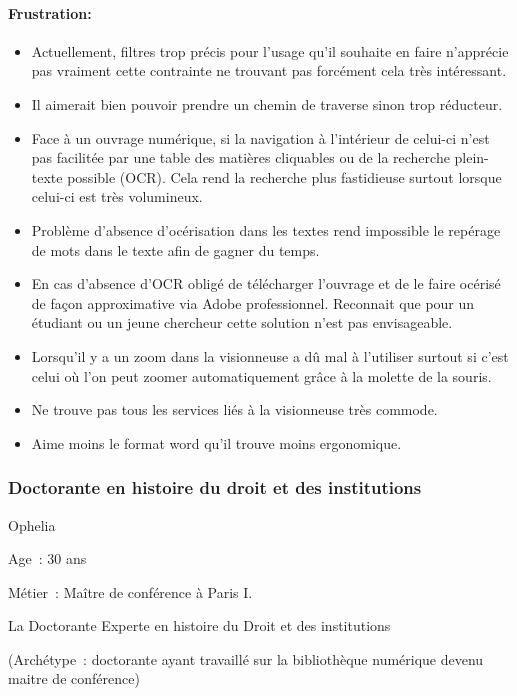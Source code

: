 \paragraph*{Frustration:} 

\begin{itemize}
	\item Actuellement, filtres trop précis pour l’usage qu’il souhaite en faire n’apprécie pas vraiment cette contrainte ne trouvant pas forcément cela très intéressant.
\item Il aimerait bien pouvoir prendre un chemin de traverse sinon trop réducteur.
\item Face à un ouvrage numérique, si la navigation à l’intérieur de celui-ci n’est pas facilitée par une table des matières cliquables ou de la recherche plein-texte possible (OCR). Cela rend la recherche plus fastidieuse surtout lorsque celui-ci est très volumineux.
\item Problème d’absence d’océrisation dans les textes rend impossible le repérage de mots dans le texte afin de gagner du temps. 
\item En cas d’absence d’OCR obligé de télécharger l’ouvrage et de le faire océrisé de façon approximative via Adobe professionnel. Reconnait que pour un étudiant ou un jeune chercheur cette solution n’est pas envisageable.
\item Lorsqu’il y a un zoom dans la visionneuse a dû mal à l’utiliser surtout si c’est celui où l’on peut zoomer automatiquement grâce à la molette de la souris.
\item Ne trouve pas tous les services liés à la visionneuse très commode.
\item Aime moins le format word qu’il trouve moins ergonomique.
\end{itemize}

\subsubsection*{Doctorante en histoire du droit et des institutions}
Ophelia 

Age : 30 ans

Métier : Maître de conférence à Paris I.

La Doctorante Experte en histoire du Droit et des institutions

(Archétype : doctorante ayant travaillé sur la bibliothèque numérique devenu maitre de conférence)

